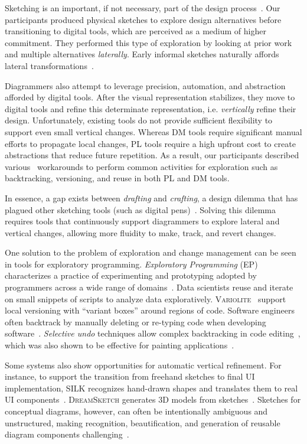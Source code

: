 Sketching is an important, if not necessary, part of the design process~\cite{BuxtonBook}. Our participants produced physical sketches to explore design alternatives before transitioning to digital tools, which are perceived as a medium of higher commitment. They performed this type of exploration by looking at prior work and multiple alternatives \emph{laterally}. Early informal sketches naturally affords lateral transformations~\cite{sketchesOfThought}. 

Diagrammers also attempt to leverage precision, automation, and abstraction afforded by digital tools. After the visual representation stabilizes, they move to digital tools and refine this determinate representation, i.e. \emph{vertically} refine their design. Unfortunately, existing tools do not provide sufficient flexibility to support even small vertical changes. Whereas DM tools require significant manual efforts to propagate local changes, PL tools require a high upfront cost to create abstractions that reduce future repetition. As a result, our participants described various ~workarounds to perform common activities for exploration such as backtracking, versioning, and reuse in both PL and DM tools. 

In essence, a gap exists between \emph{drafting} and \emph{crafting}, a design dilemma that has plagued other sketching tools (such as digital pens)~\cite{AsWeMayInk}. Solving this dilemma requires tools that continuously support diagrammers to explore lateral and vertical changes, allowing more fluidity to make, track, and revert changes.


One solution to the problem of exploration and change management can be seen in tools for exploratory programming. \emph{Exploratory Programming} (EP) characterizes a practice of experimenting and prototyping adopted by programmers across a wide range of domains~\cite{EP-Original,exploringEP}. Data scientists reuse and iterate on small snippets of scripts to analyze data exploratively. \textsc{Variolite}~\cite{Variolite} support local versioning with ``variant boxes'' around regions of code. Software engineers often backtrack by manually deleting or re-typing code when developing software~\cite{backtrackingLongitudinal}. \textit{Selective undo} techniques allow complex backtracking in code editing~\cite{yoon_supporting_2015}, which was also shown to be effective for painting applications~\cite{myers_selective_2015}. 

Some systems also show opportunities for automatic vertical refinement. For instance, to support the transition from freehand sketches to final UI implementation, \textsc{SILK} recognizes hand-drawn shapes and translates them to real UI components~\cite{InteractiveSketchingUI}. \textsc{DreamSketch} generates 3D models from sketches~\cite{DreamSketch}. Sketches for conceptual diagrams, however, can often be intentionally ambiguous and unstructured, making recognition, beautification, and generation of reusable diagram components challenging~\cite{designSketches}.

